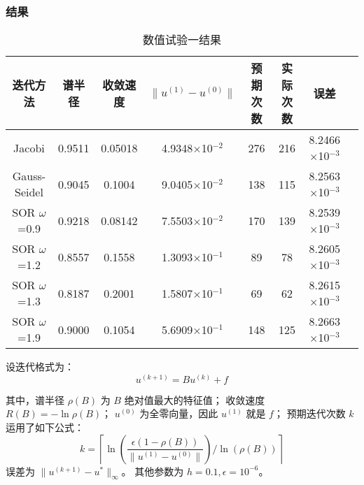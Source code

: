 \documentclass{article}
\begin{document}
\subsubsection{结果}
\begin{center}
    \begin{table}[H]
        \caption{数值试验一结果}
        \begin{tabular}{|c|c|c|c|c|c|c|c|}
        \hline
        迭代方法           & 谱半径  & 收敛速度 & $\|u^{(1)}-u^{(0)}\|$ & 预期次数 & 实际次数 & 误差       \\ \hline
        Jacobi            & 0.9511 & 0.05018 & 4.9348$\times$10$^{-2}$ & 276      & 216      & 8.2466$\times$10$^{-3}$ \\ \hline
        Gauss-Seidel      & 0.9045 & 0.1004  & 9.0405$\times$10$^{-2}$ & 138      & 115      & 8.2563$\times$10$^{-3}$ \\ \hline
        SOR $\omega$=0.9  & 0.9218 & 0.08142 & 7.5503$\times$10$^{-2}$ & 170      & 139      & 8.2539$\times$10$^{-3}$ \\ \hline
        SOR $\omega$=1.2  & 0.8557 & 0.1558  & 1.3093$\times$10$^{-1}$ & 89       & 78       & 8.2605$\times$10$^{-3}$ \\ \hline
        SOR $\omega$=1.3  & 0.8187 & 0.2001  & 1.5807$\times$10$^{-1}$ & 69       & 62       & 8.2615$\times$10$^{-3}$ \\ \hline
        SOR $\omega$=1.9  & 0.9000 & 0.1054  & 5.6909$\times$10$^{-1}$ & 148      & 125      & 8.2663$\times$10$^{-3}$ \\ \hline
        \end{tabular}
    \end{table}
\end{center}
设迭代格式为：
\begin{equation*}
    u^{(k+1)}=Bu^{(k)}+f
\end{equation*}

其中，谱半径 $\rho(B)$ 为 $B$ 绝对值最大的特征值；
收敛速度 $R(B)=-\ln\rho(B)$；
$u^{(0)}$ 为全零向量，因此 $u^{(1)}$ 就是 $f$；
预期迭代次数 $k$ 运用了如下公式：
\begin{equation*}
    k=\left\lceil\ln\left(\frac{\epsilon(1-\rho(B))}{\|u^{(1)}-u^{(0)}\|}\right)/\ln(\rho(B))\right\rceil
\end{equation*}
误差为 $\|u^{(k+1)}-u^{*}\|_{\infty}$。
其他参数为 $h=0.1,\epsilon=10^{-6}$。
\end{document}
